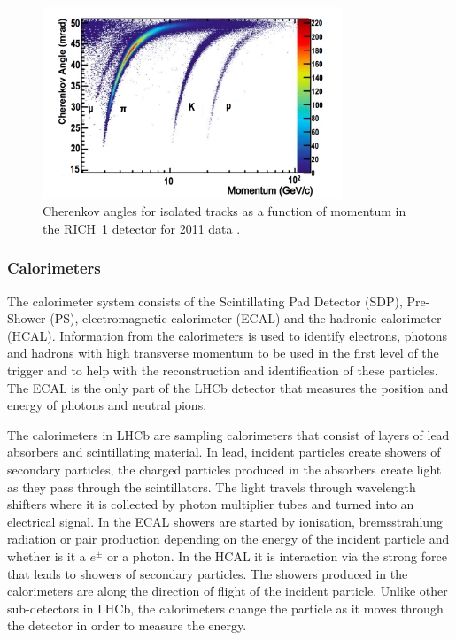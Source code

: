 \begin{figure}[htb]
  \centering
  \includegraphics[width=0.8\textwidth]{./Figs/LHC_LHCb/RICH1_performance.png}
  \caption{Cherenkov angles for isolated tracks as a function of momentum in the RICH~1 detector for 2011 data \cite{Adinolfi:2012qfa}.}
  \label{fig:RICH_preformance}
\end{figure}


\subsubsection{Calorimeters}
\label{Calo}

The calorimeter system consists of the Scintillating Pad Detector (SDP), Pre-Shower (PS), electromagnetic calorimeter (ECAL) and the hadronic calorimeter (HCAL). Information from the calorimeters is used to identify electrons, photons and hadrons with high transverse momentum to be used in the first level of the trigger and to help with the reconstruction and identification of these particles. The ECAL is the only part of the LHCb detector that measures the position and energy of photons and neutral pions. 

The calorimeters in LHCb are sampling calorimeters that consist of layers of lead absorbers and scintillating material. In lead, incident particles create showers of secondary particles, the charged particles produced in the absorbers create light as they pass through the scintillators. The light travels through wavelength shifters where it is collected by photon multiplier tubes and turned into an electrical signal. In the ECAL showers are started by ionisation, bremsstrahlung radiation or pair production depending on the energy of the incident particle and whether is it a $e^{\pm}$ or a photon. In the HCAL it is interaction via the strong force that leads to showers of secondary particles. The showers produced in the calorimeters are along the direction of flight of the incident particle. Unlike other sub-detectors in LHCb, the calorimeters change the particle as it moves through the detector in order to measure the energy.


